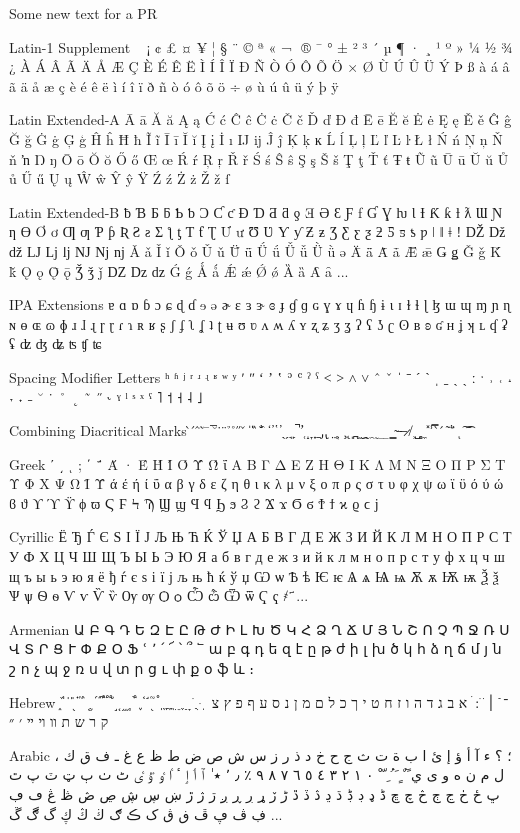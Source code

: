 \documentclass[12pt,twoside]{memoir}
\begin{document}
Some new text for a PR

Latin-1 Supplement
  ¡ ¢ £ ¤ ¥ ¦ § ¨ © ª « ¬ ­ ® ¯ ° ± ² ³ ´ µ ¶ · ¸ ¹ º » ¼ ½ ¾ ¿ À Á Â Ã Ä Å Æ Ç È É Ê Ë Ì Í Î Ï Ð Ñ Ò Ó Ô Õ Ö × Ø Ù Ú Û Ü Ý Þ ß à á â ã ä å æ ç è é ê ë ì í î ï ð ñ ò ó ô õ ö ÷ ø ù ú û ü ý þ ÿ

Latin Extended-A
Ā ā Ă ă Ą ą Ć ć Ĉ ĉ Ċ ċ Č č Ď ď Đ đ Ē ē Ĕ ĕ Ė ė Ę ę Ě ě Ĝ ĝ Ğ ğ Ġ ġ Ģ ģ Ĥ ĥ Ħ ħ Ĩ ĩ Ī ī Ĭ ĭ Į į İ ı Ĳ ĳ Ĵ ĵ Ķ ķ ĸ Ĺ ĺ Ļ ļ Ľ ľ Ŀ ŀ Ł ł Ń ń Ņ ņ Ň ň ŉ Ŋ ŋ Ō ō Ŏ ŏ Ő ő Œ œ Ŕ ŕ Ŗ ŗ Ř ř Ś ś Ŝ ŝ Ş ş Š š Ţ ţ Ť ť Ŧ ŧ Ũ ũ Ū ū Ŭ ŭ Ů ů Ű ű Ų ų Ŵ ŵ Ŷ ŷ Ÿ Ź ź Ż ż Ž ž ſ

Latin Extended-B
ƀ Ɓ Ƃ ƃ Ƅ ƅ Ɔ Ƈ ƈ Ɖ Ɗ Ƌ ƌ ƍ Ǝ Ə Ɛ Ƒ ƒ Ɠ Ɣ ƕ Ɩ Ɨ Ƙ ƙ ƚ ƛ Ɯ Ɲ ƞ Ɵ Ơ ơ Ƣ ƣ Ƥ ƥ Ʀ Ƨ ƨ Ʃ ƪ ƫ Ƭ ƭ Ʈ Ư ư Ʊ Ʋ Ƴ ƴ Ƶ ƶ Ʒ Ƹ ƹ ƺ ƻ Ƽ ƽ ƾ ƿ ǀ ǁ ǂ ǃ Ǆ ǅ ǆ Ǉ ǈ ǉ Ǌ ǋ ǌ Ǎ ǎ Ǐ ǐ Ǒ ǒ Ǔ ǔ Ǖ ǖ Ǘ ǘ Ǚ ǚ Ǜ ǜ ǝ Ǟ ǟ Ǡ ǡ Ǣ ǣ Ǥ ǥ Ǧ ǧ Ǩ ǩ Ǫ ǫ Ǭ ǭ Ǯ ǯ ǰ Ǳ ǲ ǳ Ǵ ǵ Ǻ ǻ Ǽ ǽ Ǿ ǿ Ȁ ȁ Ȃ ȃ ...

IPA Extensions
ɐ ɑ ɒ ɓ ɔ ɕ ɖ ɗ ɘ ə ɚ ɛ ɜ ɝ ɞ ɟ ɠ ɡ ɢ ɣ ɤ ɥ ɦ ɧ ɨ ɩ ɪ ɫ ɬ ɭ ɮ ɯ ɰ ɱ ɲ ɳ ɴ ɵ ɶ ɷ ɸ ɹ ɺ ɻ ɼ ɽ ɾ ɿ ʀ ʁ ʂ ʃ ʄ ʅ ʆ ʇ ʈ ʉ ʊ ʋ ʌ ʍ ʎ ʏ ʐ ʑ ʒ ʓ ʔ ʕ ʖ ʗ ʘ ʙ ʚ ʛ ʜ ʝ ʞ ʟ ʠ ʡ ʢ ʣ ʤ ʥ ʦ ʧ ʨ

Spacing Modifier Letters
ʰ ʱ ʲ ʳ ʴ ʵ ʶ ʷ ʸ ʹ ʺ ʻ ʼ ʽ ʾ ʿ ˀ ˁ ˂ ˃ ˄ ˅ ˆ ˇ ˈ ˉ ˊ ˋ ˌ ˍ ˎ ˏ ː ˑ ˒ ˓ ˔ ˕ ˖ ˗ ˘ ˙ ˚ ˛ ˜ ˝ ˞ ˠ ˡ ˢ ˣ ˤ ˥ ˦ ˧ ˨ ˩

Combining Diacritical Marks
̀ ́ ̂ ̃ ̄ ̅ ̆ ̇ ̈ ̉ ̊ ̋ ̌ ̍ ̎ ̏ ̐ ̑ ̒ ̓ ̔ ̕ ̖ ̗ ̘ ̙ ̚ ̛ ̜ ̝ ̞ ̟ ̠ ̡ ̢ ̣ ̤ ̥ ̦ ̧ ̨ ̩ ̪ ̫ ̬ ̭ ̮ ̯ ̰ ̱ ̲ ̳ ̴ ̵ ̶ ̷ ̸ ̹ ̺ ̻ ̼ ̽ ̾ ̿ ̀ ́ ͂ ̓ ̈́ ͅ ͠ ͡

Greek
ʹ ͵ ͺ ; ΄ ΅ Ά · Έ Ή Ί Ό Ύ Ώ ΐ Α Β Γ Δ Ε Ζ Η Θ Ι Κ Λ Μ Ν Ξ Ο Π Ρ Σ Τ Υ Φ Χ Ψ Ω Ϊ Ϋ ά έ ή ί ΰ α β γ δ ε ζ η θ ι κ λ μ ν ξ ο π ρ ς σ τ υ φ χ ψ ω ϊ ϋ ό ύ ώ ϐ ϑ ϒ ϓ ϔ ϕ ϖ Ϛ Ϝ Ϟ Ϡ Ϣ ϣ Ϥ ϥ Ϧ ϧ Ϩ ϩ Ϫ ϫ Ϭ ϭ Ϯ ϯ ϰ ϱ ϲ ϳ

Cyrillic
Ё Ђ Ѓ Є Ѕ І Ї Ј Љ Њ Ћ Ќ Ў Џ А Б В Г Д Е Ж З И Й К Л М Н О П Р С Т У Ф Х Ц Ч Ш Щ Ъ Ы Ь Э Ю Я а б в г д е ж з и й к л м н о п р с т у ф х ц ч ш щ ъ ы ь э ю я ё ђ ѓ є ѕ і ї ј љ њ ћ ќ ў џ Ѡ ѡ Ѣ ѣ Ѥ ѥ Ѧ ѧ Ѩ ѩ Ѫ ѫ Ѭ ѭ Ѯ ѯ Ѱ ѱ Ѳ ѳ Ѵ ѵ Ѷ ѷ Ѹ ѹ Ѻ ѻ Ѽ ѽ Ѿ ѿ Ҁ ҁ ҂ ҃ ...

Armenian
Ա Բ Գ Դ Ե Զ Է Ը Թ Ժ Ի Լ Խ Ծ Կ Հ Ձ Ղ Ճ Մ Յ Ն Շ Ո Չ Պ Ջ Ռ Ս Վ Տ Ր Ց Ւ Փ Ք Օ Ֆ ՙ ՚ ՛ ՜ ՝ ՞ ՟ ա բ գ դ ե զ է ը թ ժ ի լ խ ծ կ հ ձ ղ ճ մ յ ն շ ո չ պ ջ ռ ս վ տ ր ց ւ փ ք օ ֆ և ։

Hebrew
֑ ֒ ֓ ֔ ֕ ֖ ֗ ֘ ֙ ֚ ֛ ֜ ֝ ֞ ֟ ֠ ֡ ֣ ֤ ֥ ֦ ֧ ֨ ֩ ֪ ֫ ֬ ֭ ֮ ֯ ְ ֱ ֲ ֳ ִ ֵ ֶ ַ ָ ֹ ֻ ּ ֽ ־ ֿ ׀ ׁ ׂ ׃ ׄ א ב ג ד ה ו ז ח ט י ך כ ל ם מ ן נ ס ע ף פ ץ צ ק ר ש ת װ ױ ײ ׳ ״

Arabic
، ؛ ؟ ء آ أ ؤ إ ئ ا ب ة ت ث ج ح خ د ذ ر ز س ش ص ض ط ظ ع غ ـ ف ق ك ل م ن ه و ى ي ً ٌ ٍ َ ُ ِ ّ ْ ٠ ١ ٢ ٣ ٤ ٥ ٦ ٧ ٨ ٩ ٪ ٫ ٬ ٭ ٰ ٱ ٲ ٳ ٴ ٵ ٶ ٷ ٸ ٹ ٺ ٻ ټ ٽ پ ٿ ڀ ځ ڂ ڃ ڄ څ چ ڇ ڈ ډ ڊ ڋ ڌ ڍ ڎ ڏ ڐ ڑ ڒ ړ ڔ ڕ ږ ڗ ژ ڙ ښ ڛ ڜ ڝ ڞ ڟ ڠ ڡ ڢ ڣ ڤ ڥ ڦ ڧ ڨ ک ڪ ګ ڬ ڭ ڮ گ ڰ ڱ ...
\end{document}
